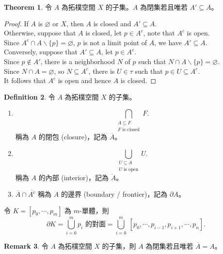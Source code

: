 \documentclass[12pt]{article}
\theoremstyle{definition}
\newtheorem{definition}{Definition}[section]
\newtheorem{theorem}[definition]{Theorem}
\newtheorem{remark}[definition]{Remark}
\newcommand\<{\langle}
\renewcommand\>{\rangle}
\begin{document}
\begin{CJK}{UTF8}{bsmi}
\begin{theorem}
    令 $A$ 為拓樸空間 $X$ 的子集。$A$ 為閉集若且唯若 $A'\subseteq A$。
\end{theorem}
\begin{proof}
    If $A$ is $\varnothing$ or $X$, then $A$ is closed and $A'\subseteq A$. \\
    Otherwise, suppose that $A$ is closed, let $p\in A^c$, note that $A^c$ is open. \\
    Since $A^c\cap A\backslash\{p\}=\varnothing$, $p$ is not a limit point of $A$, we have $A'\subseteq A$. \\
    Conversely, suppose that $A'\subseteq A$, let $p\in A^c$. \\
    Since $p\notin A'$, there is a neighborhood $N$ of $p$ such that $N\cap A\backslash\{p\}=\varnothing$. \\
    Since $N\cap A=\varnothing$, so $N\subseteq A^c$, there is $U\in\tau$ such that $p\in U\subseteq A^c$. \\
    It follows that $A^c$ is open and hence $A$ is closed.
\end{proof}

\begin{definition}
    令 $A$ 為拓樸空間 $X$ 的子集。
    \begin{enumerate}
        \item
        \[
            \bigcap_{\substack{A\subseteq F \\ F\text{ is closed}}} F.
        \]
        稱為 $A$ 的閉包 (closure)，記為 $\overline{A}$。
        \item
        \[
            \bigcup_{\substack{U\subseteq A \\ U\text{ is open}}} U.
        \]
        稱為 $A$ 的內部 (interior)，記為 $\mathring{A}$。
        \item $\overline{A}\cap\overline{A^c}$ 稱為 $A$ 的邊界 (boundary / frontier)，記為 $\partial A$。
    \end{enumerate}
\end{definition}

令 $K=[p_0, \cdots, p_m]$ 為 $m$-單體，則
\[
    \partial K
    = \bigcup_{i=0}^m p_i\text{ 的對面}
    = \bigcup_{i=0}^m\ [p_0, \cdots, p_{i-1}, p_{i+1}, \cdots, p_n].
\]

\begin{remark}
    令 $A$ 為拓樸空間 $X$ 的子集，則 $A$ 為閉集若且唯若 $\overline{A}=A$。
\end{remark}


\end{CJK}
\end{document}
